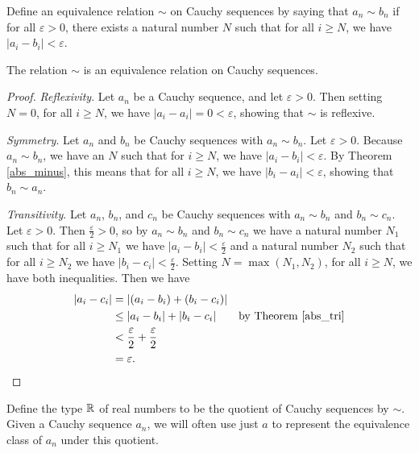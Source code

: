 \documentclass[../../math.tex]{subfiles}
\begin{document}
\begin{definition}
    Define an equivalence relation $\sim$ on Cauchy sequences by saying that
    $a_n \sim b_n$ if for all $\varepsilon > 0$, there exists a natural number
    $N$ such that for all $i \geq N$, we have $|a_i - b_i| < \varepsilon$.
\end{definition}

\begin{lemma}
    The relation $\sim$ is an equivalence relation on Cauchy sequences.
\end{lemma}
\begin{proof}
    \textit{Reflexivity}.  Let $a_n$ be a Cauchy sequence, and let $\varepsilon
    > 0$.  Then setting $N = 0$, for all $i \geq N$, we have $|a_i - a_i| = 0 <
    \varepsilon$, showing that $\sim$ is reflexive.

    \textit{Symmetry}.  Let $a_n$ and $b_n$ be Cauchy sequences with $a_n \sim
    b_n$.  Let $\varepsilon > 0$.  Because $a_n \sim b_n$, we have an $N$ such
    that for $i \geq N$, we have $|a_i - b_i| < \varepsilon$.  By Theorem
    \ref{abs_minus}, this means that for all $i \geq N$, we have $|b_i - a_i| <
    \varepsilon$, showing that $b_n \sim a_n$.

    \textit{Transitivity}.  Let $a_n$, $b_n$, and $c_n$ be Cauchy sequences with
    $a_n \sim b_n$ and $b_n \sim c_n$.  Let $\varepsilon > 0$.  Then
    $\frac{\varepsilon}{2} > 0$, so by $a_n \sim b_n$ and $b_n \sim c_n$ we have
    a natural number $N_1$ such that for all $i \geq N_1$ we have $|a_i - b_i| <
    \frac{\varepsilon}{2}$ and a natural number $N_2$ such that for all $i \geq
    N_2$ we have $|b_i - c_i| < \frac{\varepsilon}{2}$.  Setting $N = \max(N_1,
    N_2)$, for all $i \geq N$, we have both inequalities.  Then we have
    \begin{align*}
        |a_i - c_i|
        &= |(a_i - b_i) + (b_i - c_i)| && \\
        &\leq |a_i - b_i| + |b_i - c_i| && \text{by Theorem \ref{abs_tri}} \\
        &< \frac{\varepsilon}{2} + \frac{\varepsilon}{2} && \\
        &= \varepsilon. &&
    \end{align*}
\end{proof}

\begin{definition}
    Define the type $\mathbb{R}$ of real numbers to be the quotient of Cauchy sequences
    by $\sim$.  Given a Cauchy sequence $a_n$, we will often use just $a$ to
    represent the equivalence class of $a_n$ under this quotient.
\end{definition}
\end{document}
